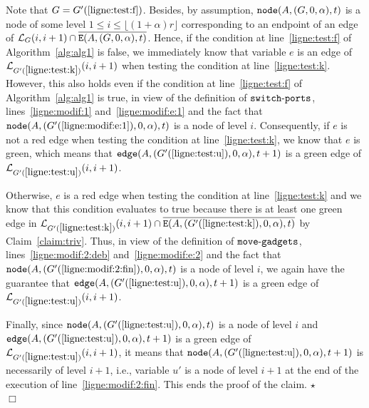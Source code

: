 \documentclass[11pt]{article}
\newcommand{\qed}{\hfill $\Box$ \bigbreak}
\newenvironment{proof}{\noindent {\bf Proof.}}{\qed}
\newenvironment{proofclaim}{\noindent{\bf Proof of the claim.}}{\hfill$\star$}
\begin{document}
{\begin{proof}
\begin{proofclaim}
Note that $G=G'(\ref{ligne:test:f})$. Besides, by assumption, ${\tt node}(A,(G,0,\alpha),t)$ is a node of some level $1\leq i\leq\lfloor(1+\alpha)r\rfloor$ corresponding to an endpoint of an edge of $\mathcal{L}_{G}(i,i+1)\cap\overline{{\tt E}(A,(G,0,\alpha),t)}$. Hence, if the condition at line~\ref{ligne:test:f} of Algorithm~\ref{alg:alg1} is false, we immediately know that variable $e$ is an edge of $\mathcal{L}_{G'(\ref{ligne:test:k})}(i,i+1)$ when testing the condition at line~\ref{ligne:test:k}. However, this also holds even if the condition at line~\ref{ligne:test:f} of Algorithm~\ref{alg:alg1} is true, in view of the definition of ${\tt switch\mbox{-}ports}$, lines~\ref{ligne:modif:1} and~\ref{ligne:modif:e:1} and the fact that ${\tt node}(A,(G'(\ref{ligne:modif:e:1}),0,\alpha),t)$ is a node of level $i$. Consequently, if $e$ is not a red edge when testing the condition at line~\ref{ligne:test:k}, we know that $e$ is green, which means that ${\tt edge}(A,(G'({\ref{ligne:test:u}}),0,\alpha),t+1)$ is a green edge of $\mathcal{L}_{G'({\ref{ligne:test:u}})}(i,i+1)$.

Otherwise, $e$ is a red edge when testing the condition at line~\ref{ligne:test:k} and we know that this condition evaluates to true because there is at least one green edge in $\mathcal{L}_{G'({\ref{ligne:test:k}})}(i,i+1)\cap\overline{{\tt E}(A,(G'({\ref{ligne:test:k}}),0,\alpha),t)}$ by Claim~\ref{claim:triv}. Thus, in view of the definition of ${\tt move\mbox{-}gadgets}$, lines~\ref{ligne:modif:2:deb} and~\ref{ligne:modif:e:2} and the fact that ${\tt node}(A,(G'(\ref{ligne:modif:2:fin}),0,\alpha),t)$ is a node of level $i$, we again have the guarantee that ${\tt edge}(A,(G'({\ref{ligne:test:u}}),0,\alpha),t+1)$ is a green edge of $\mathcal{L}_{G'({\ref{ligne:test:u}})}(i,i+1)$.

Finally, since ${\tt node}(A,(G'({\ref{ligne:test:u}}),0,\alpha),t)$ is a node of level $i$ and ${\tt edge}(A,(G'({\ref{ligne:test:u}}),0,\alpha),t+1)$ is a green edge of $\mathcal{L}_{G'({\ref{ligne:test:u}})}(i,i+1)$, it means that ${\tt node}(A,(G'({\ref{ligne:test:u}}),0,\alpha),t+1)$ is necessarily of level $i+1$, i.e., variable $u'$ is a node of level $i+1$ at the end of the execution of line~\ref{ligne:modif:2:fin}. This ends the proof of the claim.
\end{proofclaim}
~\\


\end{proof}}
\end{document}
